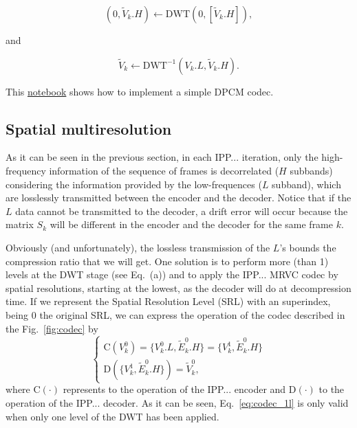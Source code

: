 \begin{equation}
  (0, \tilde{V}_k.H) \leftarrow \text{DWT}(0, [\tilde{V}_k.H]),
  \tag{j}
\end{equation}

and

\begin{equation}
  \tilde{V}_k \leftarrow \text{DWT}^{-1}(V_k.L, \tilde{V}_k.H).
  \tag{k}
\end{equation}

This
\href{https://github.com/Sistemas-Multimedia/Sistemas-Multimedia.github.io/blob/master/milestones/12-IPP_coding/DPCM.ipynb}{notebook}
shows how to implement a simple DPCM codec.

\subsection{Spatial multiresolution}
As it can be seen in the previous section, in each IPP... iteration,
only the high-frequency information of the sequence of frames is
decorrelated ($H$ subbands) considering the information provided by
the low-frequences ($L$ subband), which are losslessly transmitted
between the encoder and the decoder. Notice that if the $L$ data
cannot be transmitted to the decoder, a drift error will occur because
the matrix $S_k$ will be different in the encoder and the decoder for
the same frame $k$.

Obviously (and unfortunately), the lossless transmission of the $L$'s
bounds the compression ratio that we will get. One solution is to
perform more (than 1) levels at the DWT stage (see Eq.~(a)) and to
apply the IPP... MRVC codec by spatial resolutions, starting at the
lowest, as the decoder will do at decompression time. If we represent
the Spatial Resolution Level (SRL) with an superindex, being 0 the
original SRL, we can express the operation of the codec described in
the Fig.~\ref{fig:codec} by
\begin{equation}
  \left\{
    \begin{array}{l}
      \text{C}(V^0_k) = \{V^0_k.L, \tilde{E}^0_k.H\} = \{V^1_k, \tilde{E}^0_k.H\} \\
      \text{D}(\{V^1_k, \tilde{E}^0_k.H\}) = \tilde{V}^0_k,
    \end{array}
  \right.
  \label{eq:codec_1l}
\end{equation}
where $\text{C}(\cdot)$ represents to the operation of the
IPP... encoder and $\text{D}(\cdot)$ to the operation of the
IPP... decoder. As it can be seen, Eq.~\ref{eq:codec_1l} is only valid
when only one level of the DWT has been applied.

